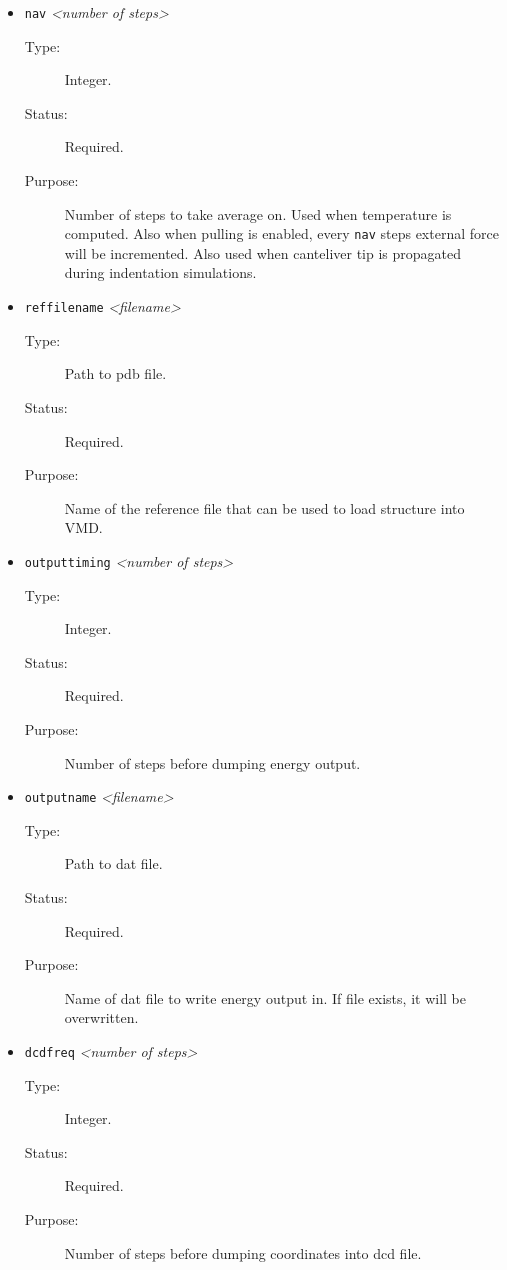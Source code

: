 \documentclass[a4paper]{article}
\begin{document}
\begin{itemize}

\item \texttt{nav} \textit{\textless number of steps\textgreater}
\begin{description}
\item[Type:] Integer.
\item[Status:] Required.
\item[Purpose:] Number of steps to take average on. Used when temperature is computed. Also when pulling is enabled, every \texttt{nav} steps external force will be incremented. Also used when canteliver tip is propagated during indentation simulations.
\end{description}

\item \texttt{reffilename} \textit{\textless filename\textgreater}
\begin{description}
\item[Type:] Path to pdb file.
\item[Status:] Required.
\item[Purpose:] Name of the reference file that can be used to load structure into VMD.
\end{description}

\item \texttt{outputtiming} \textit{\textless number of steps\textgreater}
\begin{description}
\item[Type:] Integer.
\item[Status:] Required.
\item[Purpose:] Number of steps before dumping energy output.
\end{description}

\item \texttt{outputname} \textit{\textless filename\textgreater}
\begin{description}
\item[Type:] Path to dat file.
\item[Status:] Required.
\item[Purpose:] Name of dat file to write energy output in. If file exists, it will be overwritten.
\end{description}

\item \texttt{dcdfreq} \textit{\textless number of steps\textgreater}
\begin{description}
\item[Type:] Integer.
\item[Status:] Required.
\item[Purpose:] Number of steps before dumping coordinates into dcd file.
\end{description}


\end{itemize}
\end{document}
